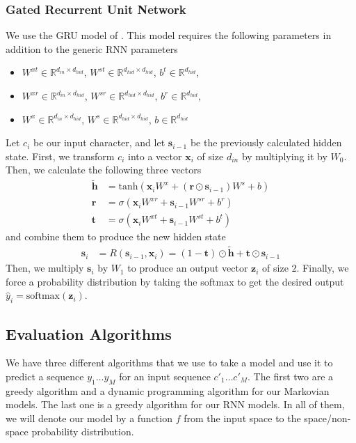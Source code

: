 \documentclass[11pt]{article}
\begin{document}
\subsubsection{Gated Recurrent Unit Network}

We use the GRU model of \cite{cho2014gru}. This model requires the following parameters in addition to the generic RNN parameters
\begin{itemize}
  \item $W^{xt} \in \mathbb{R}^{d_{in} \times d_{hid}}$, $W^{st} \in \mathbb{R}^{d_{hid} \times d_{hid}}$, $b^t \in \mathbb{R}^{d_{hid}}$, 
  \item $W^{xr} \in \mathbb{R}^{d_{in} \times d_{hid}}$, $W^{sr} \in \mathbb{R}^{d_{hid} \times d_{hid}}$, $b^r \in \mathbb{R}^{d_{hid}}$, 
  \item $W^x \in \mathbb{R}^{d_{in} \times d_{hid}}$, $W^s \in \mathbb{R}^{d_{hid} \times d_{hid}}$, $b \in \mathbb{R}^{d_{hid}}$
\end{itemize}

Let $c_i$ be our input character, and let $\mathbf{s}_{i-1}$ be the previously calculated hidden state. First, we transform $c_i$ into a vector $\mathbf{x}_i$ of size $d_{in}$ by multiplying it by $W_0$. Then, we calculate the following three vectors
\begin{align*}
  \widetilde{\mathbf{h}} &= \text{tanh}(\mathbf{x}_iW^{x} + (\mathbf{r} \odot \mathbf{s}_{i-1})W^s + b) \\
  \mathbf{r} &= \sigma(\mathbf{x}_iW^{xr} + \mathbf{s}_{i-1}W^{sr} + b^r) \\
  \mathbf{t} &= \sigma(\mathbf{x}_iW^{xt} + \mathbf{s}_{i-1}W^{st} + b^t)
\end{align*}
and combine them to produce the new hidden state
\begin{align*}
  \mathbf{s}_i &= R(\mathbf{s}_{i-1}, \mathbf{x}_i) = (1 - \mathbf{t}) \odot \widetilde{\mathbf{h}} + \mathbf{t} \odot \mathbf{s}_{i-1}
\end{align*}
Then, we multiply $\mathbf{s}_i$ by $W_1$ to produce an output vector $\mathbf{z}_i$ of size $2$. Finally, we force a probability distribution by taking the softmax to get the desired output $\hat{y}_i = \text{softmax}(\mathbf{z}_i)$. 
\subsection{Evaluation Algorithms}

We have three different algorithms that we use to take a model and use it to predict a sequence $y_1\dots y_M$ for an input sequence $c'_1\dots c'_M$. The first two are a greedy algorithm and a dynamic programming algorithm for our Markovian models. The last one is a greedy algorithm for our RNN models. In all of them, we will denote our model by a function $f$ from the input space to the space/non-space probability distribution. 
\end{document}
